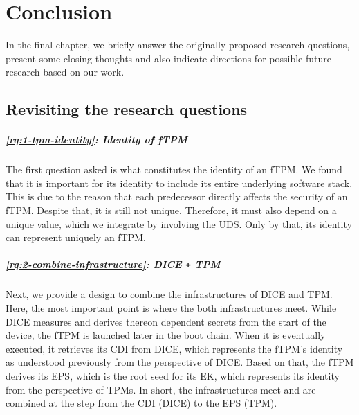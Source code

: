 
\chapter{Conclusion}\label{chapter:future_work_and_conclusion}

In the final chapter, we briefly answer the originally proposed research questions, present some closing thoughts and also indicate directions for possible future research based on our work.

\section{Revisiting the research questions}


\paragraph{\ref{rq:1-tpm-identity}: Identity of \ac{fTPM}}
The first question asked is what constitutes the identity of an fTPM\@.
We found that it is important for its identity to include its entire underlying software stack.
This is due to the reason that each predecessor directly affects the security of an \ac{fTPM}.
Despite that, it is still not unique.
Therefore, it must also depend on a unique value, which we integrate by involving the \ac{UDS}.
Only by that, its identity can represent uniquely an \ac{fTPM}.

\paragraph{\ref{rq:2-combine-infrastructure}: \acs{DICE} \texttt{+} \acs{TPM}}
Next, we provide a design to combine the infrastructures of \ac{DICE} and \ac{TPM}.
Here, the most important point is where the both infrastructures meet.
While \ac{DICE} measures and derives thereon dependent secrets from the start of the device, the \ac{fTPM} is launched later in the boot chain.
When it is eventually executed, it retrieves its \ac{CDI} from \ac{DICE}, which represents the fTPM's identity as understood previously from the perspective of \ac{DICE}.
Based on that, the \ac{fTPM} derives its \ac{EPS}, which is the root seed for its \ac{EK}, which represents its identity from the perspective of \acp{TPM}.
In short, the infrastructures meet and are combined at the step from the \ac{CDI} (DICE) to the \ac{EPS} (TPM).

